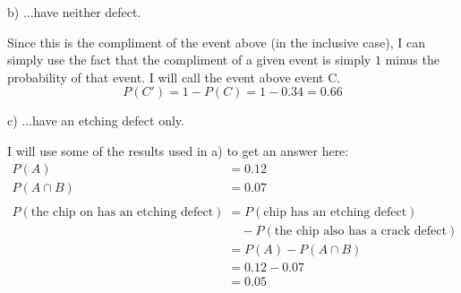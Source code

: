\documentclass[12pt, letterpaper]{article}
\begin{document}
\pagebreak

\qquad b) ...have neither defect.
\begin{center}
	Since this is the compliment of the event above (in the inclusive case), I can simply use the fact that the compliment of a given event is simply $1$ minus the probability of that event. I will call the event above event C.
	$$P(C') = 1 - P(C) = 1 - 0.34 = \boxed{0.66}$$
\end{center}

\qquad c) ...have an etching defect only.
\begin{center}
	I will use some of the results used in a) to get an answer here:
	\begin{align*}
		P(A) &= 0.12 \\
		P(A \cap B) &= 0.07 \\
		\\
		P(\text{the chip on has an etching defect}) &= P(\text{chip has an etching defect}) \\
		&\quad- P(\text{the chip also has a crack defect}) \\
		&= P(A) - P(A \cap B) \\
		&= 0.12 - 0.07 \\
		&= \boxed{0.05}
	\end{align*}
\end{center}
\end{document}
